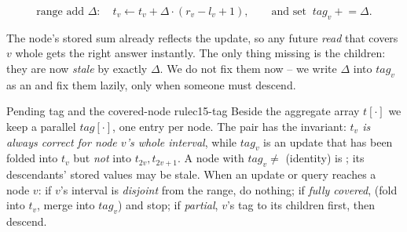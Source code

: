 \[
  \text{range add }\Delta:\quad t_v \leftarrow t_v + \Delta\cdot(r_v-l_v+1),
  \qquad\text{and set }\ \mathit{tag}_v \mathrel{+}= \Delta .
\]

The node's stored sum already reflects the update, so any future \emph{read} that covers \(v\) whole gets the right answer instantly.  The only thing missing is the children: they are now \emph{stale} by exactly \(\Delta\).  We do not fix them now -- we write \(\Delta\) into \(\mathit{tag}_v\) as an  and fix them lazily, only when someone must descend.

\begin{definition}{Pending tag and the covered-node rule}{c15-tag}
Beside the aggregate array \(t[\cdot]\) we keep a parallel \(\mathit{tag}[\cdot]\), one entry per node.  The pair has the invariant: \emph{\(t_v\) is always correct for node \(v\)'s whole interval}, while \(\mathit{tag}_v\) is an update that has been folded into \(t_v\) but \emph{not} into \(t_{2v},t_{2v+1}\).  A node with \(\mathit{tag}_v\neq\) (identity) is ; its descendants' stored values may be stale.  When an update or query reaches a node \(v\): if \(v\)'s interval is \emph{disjoint} from the range, do nothing; if \emph{fully covered},  (fold into \(t_v\), merge into \(\mathit{tag}_v\)) and stop; if \emph{partial},  \(v\)'s tag to its children first, then descend.
\end{definition}

